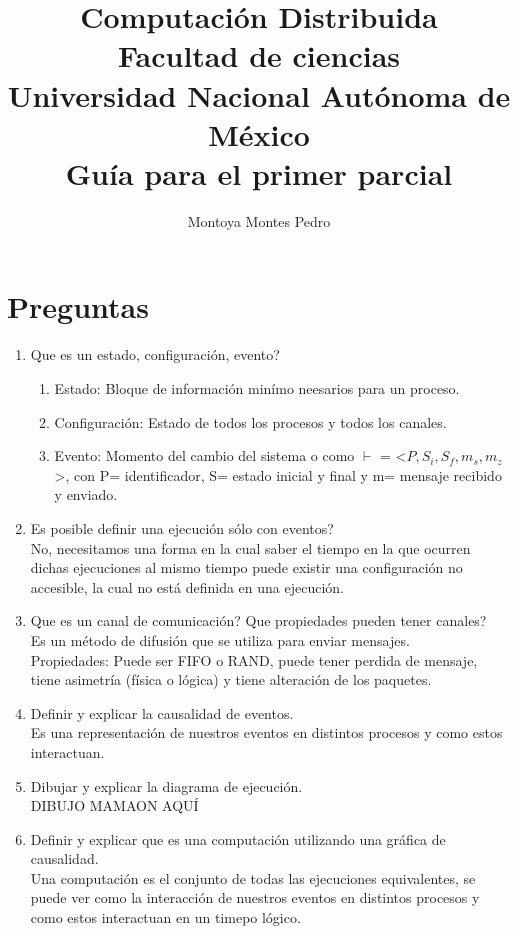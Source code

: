 \documentclass[letterpaper, 12pt]{article}
\title{Computación Distribuida\\Facultad de ciencias\\ Universidad Nacional Autónoma de México\\ Guía para el primer parcial}
\author{Montoya Montes Pedro}
\begin{document}
\maketitle

\tableofcontents
\newpage

\section{Preguntas}
	\begin{enumerate}
		\item Que es un estado, configuración, evento? 
			\begin{enumerate}
				\item Estado: Bloque de información minímo neesarios para un proceso.
				\item Configuración: Estado de todos los procesos y todos los canales.
				\item Evento: Momento del cambio del sistema o como $\vdash$ = <$P,S_{i},S_{f}, m_{s}, m_{z}$>, con P= identificador, S= estado inicial y final y m= mensaje recibido y enviado.
			\end{enumerate}
		\item Es posible definir una ejecución sólo con eventos? 
			\\ No, necesitamos una forma en la cual saber el tiempo en la que ocurren dichas ejecuciones al mismo tiempo puede existir una configuración no accesible, la cual no está definida en una ejecución.
		\item Que es un canal de comunicación? Que propiedades pueden tener canales?
			\\ Es un método de difusión que se utiliza para enviar mensajes.
			\\ Propiedades: Puede ser FIFO o RAND, puede tener perdida de mensaje, tiene asimetría (física o lógica) y tiene alteración de los paquetes.
		\item Definir y explicar la causalidad de eventos.
			\\ Es una representación de nuestros eventos en distintos procesos y como estos interactuan.
		\item Dibujar y explicar la diagrama de ejecución.
			\\ DIBUJO MAMAON AQUÍ
		\item Definir y explicar que es una computación utilizando una gráfica de causalidad.
			\\ Una computación es el conjunto de todas las ejecuciones equivalentes, se puede ver como la interacción de nuestros eventos en distintos procesos y como estos interactuan en un timepo lógico.

\end{enumerate}
\end{document}
